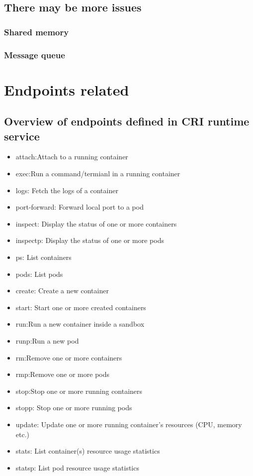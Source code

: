 \subsection{There may be more issues}
\subsubsection{Shared memory}
\subsubsection{Message queue}

\section{Endpoints related}
\subsection{Overview of endpoints defined in CRI runtime service}
\begin{itemize}
    \item  attach:Attach to a running container
    \item  exec:Run a command/termianl in a running container
    \item  logs: Fetch the logs of a container
    \item  port-forward: Forward local port to a pod

    \item  inspect: Display the status of one or more containers
    \item  inspectp: Display the status of one or more pods
    \item  ps:  List containers
    \item  pods: List pods
    
    \item  create: Create a new container
    \item  start: Start one or more created containers
    \item  run:Run a new container inside a sandbox
    \item  runp:Run a new pod
    \item  rm:Remove one or more containers
    \item  rmp:Remove one or more pods
    \item  stop:Stop one or more running containers
    \item  stopp: Stop one or more running pods

    \item  update: Update one or more running container's resources (CPU, memory etc.)
    \item  stats: List container(s) resource usage statistics
    \item  statsp: List pod resource usage statistics
\end{itemize}

